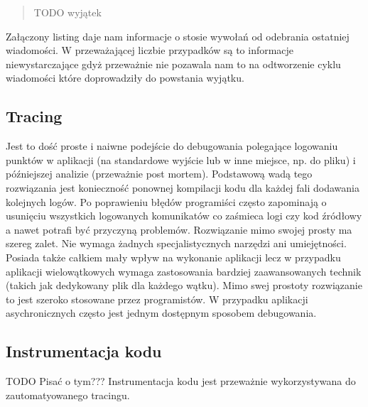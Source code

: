 \begin{quote}
TODO wyjątek
\end{quote}

Załączony listing daje nam informacje o stosie wywołań od odebrania ostatniej wiadomości. W przeważającej liczbie przypadków są to informacje niewystarczające gdyż przeważnie nie pozawala nam to na odtworzenie cyklu wiadomości które doprowadziły do powstania wyjątku.

\subsection{Tracing}

Jest to dość proste i naiwne podejście do debugowania polegające logowaniu punktów w aplikacji (na standardowe wyjście lub w inne miejsce, np. do pliku) i późniejszej analizie (przeważnie post mortem). Podstawową wadą tego rozwiązania jest konieczność ponownej kompilacji kodu dla każdej fali dodawania kolejnych logów. Po poprawieniu błędów programiści często zapominają o usunięciu wszystkich logowanych komunikatów co zaśmieca logi czy kod źródłowy a nawet potrafi być przyczyną problemów.
Rozwiązanie mimo swojej prosty ma szereg zalet. Nie wymaga żadnych specjalistycznych narzędzi ani umiejętności. Posiada także całkiem mały wpływ na wykonanie aplikacji lecz w przypadku aplikacji wielowątkowych wymaga zastosowania bardziej zaawansowanych technik (takich jak dedykowany plik dla każdego wątku). 
Mimo swej prostoty rozwiązanie to jest szeroko stosowane przez programistów. W przypadku aplikacji asychronicznych często jest jednym dostępnym sposobem debugowania. 

\subsection{Instrumentacja kodu}

TODO Pisać o tym???
Instrumentacja kodu jest przeważnie wykorzystywana do zautomatyowanego tracingu.

